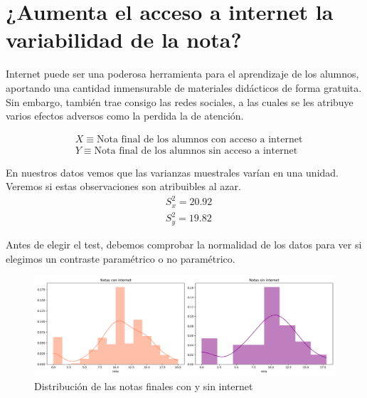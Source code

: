 \section{¿Aumenta el acceso a internet la variabilidad de la nota?}

Internet puede ser una poderosa herramienta para el aprendizaje de los alumnos, aportando una cantidad inmensurable de materiales didácticos de forma gratuita. Sin embargo, también trae consigo las redes sociales, a las cuales se les atribuye varios efectos adversos como la perdida la de atención.

\begin{equation*}
    \begin{split}
        & X \equiv \text{Nota final de los alumnos con acceso a internet}\\
        & Y \equiv \text{Nota final de los alumnos sin acceso a internet}
    \end{split}
\end{equation*}
    
En nuestros datos vemos que las varianzas muestrales varían en una unidad. Veremos si estas observaciones son atribuibles al azar.
\begin{equation*}
    \begin{split}
        & S_x^2 = 20.92\\
        & S_{y}^2 = 19.82
    \end{split}
\end{equation*}

Antes de elegir el test, debemos comprobar la normalidad de los datos para ver si elegimos un contraste paramétrico o no paramétrico.

\begin{figure}[H]
    \begin{center}
        \includegraphics[width=1\textwidth]{figures/dist-notas-internet.png}
    \end{center}
    \caption{Distribución de las notas finales con y sin internet}\label{fig:dist-notas-internet}
\end{figure}

